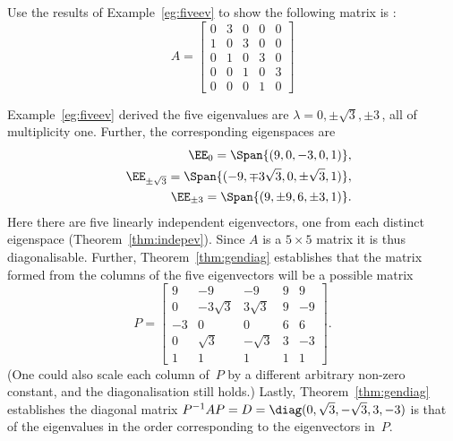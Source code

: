 \begin{example} \label{eg:fiveevp}
Use the results of Example~\ref{eg:fiveev} to show the following matrix is :
\begin{equation*}
A=\begin{bmatrix}0&3&0&0&0
\\1&0&3&0&0
\\0&1&0&3&0
\\0&0&1&0&3
\\0&0&0&1&0\end{bmatrix}
\end{equation*}
\begin{solution} 
Example~\ref{eg:fiveev} derived the five eigenvalues are  \(\lambda=0,\pm\sqrt3,\pm3\)\,, all of multiplicity one.
Further, the corresponding eigenspaces are
\begin{eqnarray*}
&&\EE_0=\Span\{(9,0,-3,0,1)\},
\\&&\EE_{\pm\sqrt3}=\Span\{(-9,\mp3\sqrt3,0,\pm\sqrt3,1)\},
\\&&\EE_{\pm3}=\Span\{(9,\pm9,6,\pm3,1)\}.
\end{eqnarray*}
Here there are five linearly independent eigenvectors, one from each distinct eigenspace  (Theorem~\ref{thm:indepev}).
Since \(A\) is a \(5\times5\) matrix it is thus diagonalisable.
Further, Theorem~\ref{thm:gendiag} establishes that the matrix formed from the columns of the five eigenvectors will be a possible matrix
\begin{equation*}
P=\begin{bmatrix} 9&-9&-9&9&9
\\0&-3\sqrt3&3\sqrt3&9&-9
\\-3&0&0&6&6
\\0&\sqrt3&-\sqrt3&3&-3
\\1&1&1&1&1
\end{bmatrix}.
\end{equation*}
(One could also scale each column of~\(P\) by a different arbitrary non-zero constant, and the diagonalisation still holds.)
Lastly, Theorem~\ref{thm:gendiag} establishes the diagonal matrix
\(P^{-1}AP=D=\diag(0,\sqrt3,-\sqrt3,3,-3)\) is that of the eigenvalues in the order corresponding to the eigenvectors in~\(P\).
\end{solution}
\end{example}





